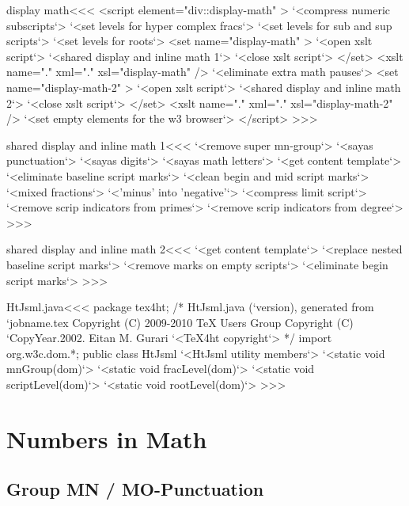 \documentclass{article}
\begin{document}
\<display math\><<<
<script element="div::display-math" >
  `<compress numeric subscripts`>
  `<set levels for hyper complex fracs`>
  `<set levels for sub and sup scripts`>
  `<set levels for roots`>
  <set name="display-math" >
     `<open xslt script`>
     `<shared display and inline math 1`>
     `<close xslt script`>
  </set>
  <xslt name="." xml="." xsl="display-math" />
  `<eliminate extra math pauses`>
  <set name="display-math-2" >
     `<open xslt script`>
     `<shared display and inline math 2`>
     `<close xslt script`>
  </set>
  <xslt name="." xml="." xsl="display-math-2" />
  `<set empty elements for the w3 browser`>
</script> 
>>>




\<shared display and inline math 1\><<<
`<remove super mn-group`>
`<sayas punctuation`>
`<sayas digits`>
`<sayas math letters`>
`<get content template`>
`<eliminate baseline script marks`> 
`<clean begin and mid script marks`> 
`<mixed fractions`> 
`<'minus' into 'negative'`> 
`<compress limit script`>
`<remove scrip indicators from primes`> 
`<remove scrip indicators from degree`> 
>>>


\<shared display and inline math 2\><<<
`<get content template`>
`<replace nested baseline script marks`>
`<remove marks on empty scripts`>
`<eliminate begin script marks`> 
>>>






\<HtJsml.java\><<<
package tex4ht;
/* HtJsml.java (`version), generated from `jobname.tex
   Copyright (C) 2009-2010 TeX Users Group
   Copyright (C) `CopyYear.2002. Eitan M. Gurari
`<TeX4ht copyright`> */
import org.w3c.dom.*;
public class HtJsml {
  `<HtJsml utility members`>
  `<static void mnGroup(dom)`>
  `<static void fracLevel(dom)`>
  `<static void scriptLevel(dom)`>
  `<static void rootLevel(dom)`>
}
>>>




\section{Numbers in Math}


\subsection{Group MN / MO-Punctuation}
\end{document}
